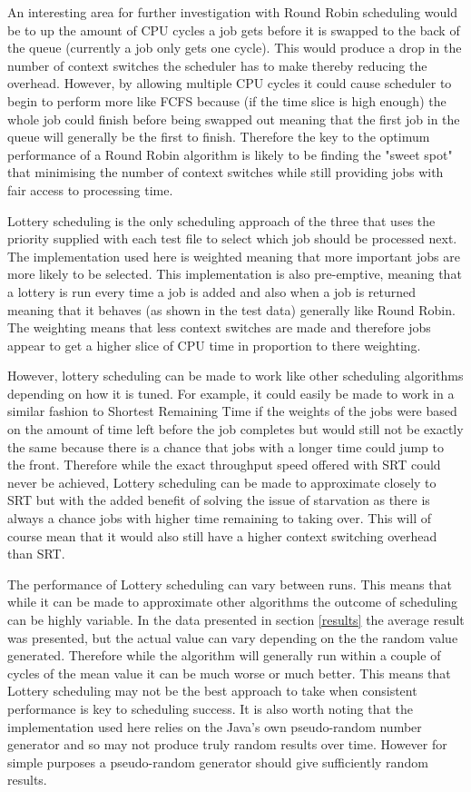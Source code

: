 \documentclass{acm_proc_article-sp}
\begin{document}
An interesting area for further investigation with Round Robin scheduling would be to up the amount of CPU cycles a job gets before it is swapped to the back of the queue (currently a job only gets one cycle). This would produce a drop in the number of context switches the scheduler has to make thereby reducing the overhead. However, by allowing multiple CPU cycles it could cause scheduler to begin to perform more like FCFS because (if the time slice is high enough) the whole job could finish before being swapped out meaning that the first job in the queue will generally be the first to finish. Therefore the key to  the optimum performance of a Round Robin algorithm is likely to be finding the "sweet spot" that minimising the number of context switches while still providing jobs with fair access to processing time.

Lottery scheduling is the only scheduling approach of the three that uses the priority supplied with each test file to select which job should be processed next. The implementation used here is weighted meaning that more important jobs are more likely to be selected. This implementation is also pre-emptive, meaning that a lottery is run every time a job is added and also when a job is returned meaning that it behaves (as shown in the test data) generally like Round Robin. The weighting means that less context switches are made and therefore jobs appear to get a higher slice of CPU time in proportion to there weighting.

However, lottery scheduling can be made to work like other scheduling algorithms depending on how it is tuned. For example, it could easily be made to work in a similar fashion to Shortest Remaining Time if the weights of the jobs were based on the amount of time left before the job completes but would still not be exactly the same because there is a chance that jobs with a longer time could jump to the front. Therefore while the exact throughput speed offered with SRT could never be achieved, Lottery scheduling can be made to approximate closely to SRT but with the added benefit of solving the issue of starvation as there is always a chance jobs with higher time remaining to taking over. This will of course mean that it would also still have a higher context switching overhead than SRT.

The performance of Lottery scheduling can vary between runs. This means that while it can be made to approximate other algorithms the outcome of scheduling can be highly variable. In the data presented in section \ref{results} the average result was presented, but the actual value can vary depending on the the random value generated. Therefore while the algorithm will generally run within a couple of cycles of the mean value it can be much worse or much better. This means that Lottery scheduling may not be the best approach to take when consistent performance is key to scheduling success. It is also worth noting that the implementation used here relies on the Java's own pseudo-random number generator and so may not produce truly random results over time. However for simple purposes a pseudo-random generator should give sufficiently random results.
\end{document}

